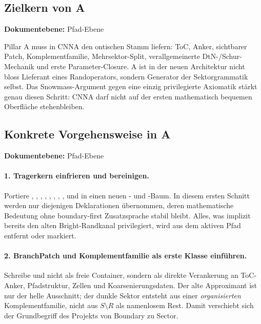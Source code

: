 \documentclass[11pt,a4paper]{article}
\let\oldpath\path
\renewcommand{\path}[1]{\oldpath{#1}}
\newcommand{\doclevel}[1]{\par\small\noindent\textbf{Dokumentebene:} #1\par\normalsize\medskip}
\begin{document}
\subsection{Zielkern von A}
\doclevel{Pfad-Ebene}
Pillar A muss in CNNA den ontischen Stamm liefern: ToC, Anker, sichtbarer Patch,
Komplementfamilie, Mehrsektor-Split, verallgemeinerte DtN-/Schur-Mechanik und erste
Parameter-Closure. A ist in der neuen Architektur nicht bloss Lieferant eines Randoperators, sondern
Generator der Sektorgrammatik selbst. Das Snowmass-Argument gegen eine einzig privilegierte
Axiomatik stärkt genau diesen Schritt: CNNA darf nicht auf der ersten mathematisch bequemen
Oberfläche stehenbleiben.\cite[pp.~1, 10--12]{Dedushenko2023}

\subsection{Konkrete Vorgehensweise in A}
\doclevel{Pfad-Ebene}
\paragraph{1. Tragerkern einfrieren und bereinigen.}
Portiere , , , ,
, , , ,
 und  in einen neuen
- und -Baum. In diesem ersten Schnitt werden nur diejenigen Deklarationen
übernommen, deren mathematische Bedeutung ohne boundary-first Zusatzsprache stabil bleibt.
Alles, was implizit bereits den alten Bright-Randkanal privilegiert, wird aus dem aktiven Pfad entfernt
oder markiert.

\paragraph{2. BranchPatch und Komplementfamilie als erste Klasse einführen.}
Schreibe  und
 nicht als freie Container, sondern als direkte
Verankerung an ToC-Anker, Pfadstruktur, Zellen und Koarsenierungsdaten. Der alte Approximant ist
nur der helle Ausschnitt; der dunkle Sektor entsteht aus einer \emph{organisierten} Komplementfamilie,
nicht aus \(S\setminus R\) als namenlosem Rest. Damit verschiebt sich der Grundbegriff des Projekts von
Boundary zu Sector.
\end{document}
